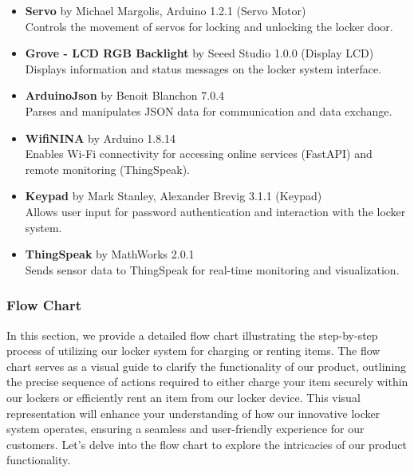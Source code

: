 \begin{itemize}
    \item \textbf{Servo} by Michael Margolis, Arduino 1.2.1 (Servo Motor) \\ Controls the movement of servos for locking and unlocking the locker door.
    \item \textbf{Grove - LCD RGB Backlight} by Seeed Studio 1.0.0 (Display LCD) \\ Displays information and status messages on the locker system interface.
    \item \textbf{ArduinoJson} by Benoit Blanchon 7.0.4 \\ Parses and manipulates JSON data for communication and data exchange.
    \item \textbf{WifiNINA} by Arduino 1.8.14 \\ Enables Wi-Fi connectivity for accessing online services (FastAPI) and remote monitoring (ThingSpeak).
    \item \textbf{Keypad} by Mark Stanley, Alexander Brevig 3.1.1 (Keypad) \\ Allows user input for password authentication and interaction with the locker system.
    \item \textbf{ThingSpeak} by MathWorks 2.0.1 \\ Sends sensor data to ThingSpeak for real-time monitoring and visualization.
\end{itemize}
\newpage
\subsubsection{Flow Chart}
In this section, we provide a detailed flow chart illustrating the step-by-step process of utilizing our 
locker system for charging or renting items. The flow chart serves as a visual guide to clarify the 
functionality of our product, outlining the precise sequence of actions required to either charge your 
item securely within our lockers or efficiently rent an item from our locker device. 
This visual representation will enhance your understanding of how our innovative locker system operates,
ensuring a seamless and user-friendly experience for our customers. 
Let's delve into the flow chart to explore the intricacies of our product functionality.

